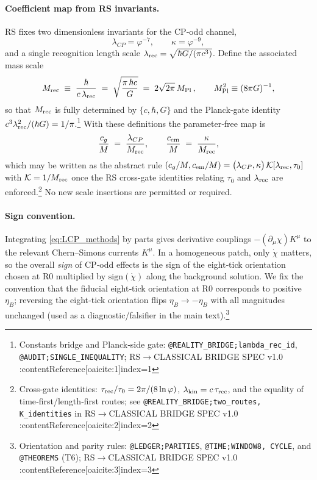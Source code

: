\documentclass[11pt]{article}
\begin{document}
\paragraph{Coefficient map from RS invariants.}
RS fixes two dimensionless invariants for the CP‑odd channel,
\begin{equation}
  \lambda_{CP}=\varphi^{-7},\qquad \kappa=\varphi^{-9},
  \label{eq:RS_invariants}
\end{equation}
and a single recognition length scale
\(
  \lambda_{\rm rec}=\sqrt{\hbar G/(\pi c^3)}
\).
Define the associated mass scale
\begin{equation}
  M_{\rm rec} \;\equiv\; \frac{\hbar}{c\,\lambda_{\rm rec}}
  \;=\; \sqrt{\frac{\pi\,\hbar c}{G}}
  \;=\; 2\sqrt{2\pi}\,M_{\rm Pl}\,,\qquad M_{\rm Pl}^2\equiv(8\pi G)^{-1},
  \label{eq:Mrec}
\end{equation}
so that \(M_{\rm rec}\) is fully determined by \(\{c,\hbar,G\}\) and the Planck‑gate identity \(c^3\lambda_{\rm rec}^2/(\hbar G)=1/\pi\).\footnote{Constants bridge and Planck‑side gate: \texttt{@REALITY\_BRIDGE;lambda\_rec\_id}, \texttt{@AUDIT;SINGLE\_INEQUALITY}; RS\(\to\)CLASSICAL BRIDGE SPEC v1.0 :contentReference[oaicite:1]{index=1}}
With these definitions the parameter‑free map is
\begin{equation}
  \frac{c_g}{M} \;=\; \frac{\lambda_{CP}}{M_{\rm rec}},
  \qquad
  \frac{c_{\rm em}}{M} \;=\; \frac{\kappa}{M_{\rm rec}},
  \label{eq:coeff_map}
\end{equation}
which may be written as the abstract rule
\(
  (c_g/M,c_{\rm em}/M)=\big(\lambda_{CP},\kappa\big)\,\mathcal{K}[\lambda_{\rm rec},\tau_0]
\)
with \(\mathcal{K}=1/M_{\rm rec}\) once the RS cross‑gate identities relating \(\tau_0\) and \(\lambda_{\rm rec}\) are enforced.\footnote{Cross‑gate identities: \(\tau_{\rm rec}/\tau_0=2\pi/(8\ln\varphi)\), \(\lambda_{\rm kin}=c\,\tau_{\rm rec}\), and the equality of time‑first/length‑first routes; see \texttt{@REALITY\_BRIDGE;two\_routes, K\_identities} in RS\(\to\)CLASSICAL BRIDGE SPEC v1.0 :contentReference[oaicite:2]{index=2}}
No new scale insertions are permitted or required.

\paragraph{Sign convention.}
Integrating \eqref{eq:LCP_methods} by parts gives derivative couplings \(-(\partial_\mu\chi)K^\mu\) to the relevant Chern–Simons currents \(K^\mu\). In a homogeneous patch, only \(\dot\chi\) matters, so the overall \emph{sign} of CP‑odd effects is the sign of the eight‑tick orientation chosen at R0 multiplied by \(\mathrm{sign}(\dot\chi)\) along the background solution. We fix the convention that the fiducial eight‑tick orientation at R0 corresponds to positive \(\eta_B\); reversing the eight‑tick orientation flips \(\eta_B\to-\eta_B\) with all magnitudes unchanged (used as a diagnostic/falsifier in the main text).\footnote{Orientation and parity rules: \texttt{@LEDGER;PARITIES}, \texttt{@TIME;WINDOW8, CYCLE}, and \texttt{@THEOREMS} (T6); RS\(\to\)CLASSICAL BRIDGE SPEC v1.0 :contentReference[oaicite:3]{index=3}}
\end{document}
